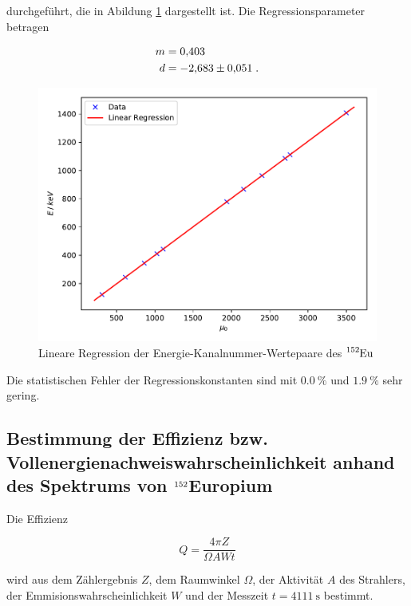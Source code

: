 durchgeführt, die in Abildung \ref{fig:plot5} dargestellt ist.
Die Regressionsparameter betragen

\begin{align*}
  m &= \num{0.403 +- 0.000} \\
  d &= \num{-2.683 +- 0.051} \; .
\end{align*}

\begin{figure}
  \centering
  \includegraphics{content/plot5.pdf}
  \caption{Lineare Regression der Energie-Kanalnummer-Wertepaare des $\ce{^{152}Eu}$}
  \label{fig:plot5}
\end{figure}

Die statistischen Fehler der Regressionskonstanten sind mit $\SI{0.0}{\percent}$ und $\SI{1.9}{\percent}$ sehr gering.


\subsection{Bestimmung der Effizienz bzw. Vollenergienachweiswahrscheinlichkeit anhand des Spektrums von $\ce{^{152}}$Europium}

Die Effizienz

\begin{equation}
  Q = \frac{4 \pi Z}{\Omega A W t}
\end{equation}

wird aus dem Zählergebnis $Z$, dem Raumwinkel $\Omega$, der Aktivität $A$ des Strahlers, 
der Emmisionswahrscheinlichkeit $W$ und der Messzeit $t = \SI{4111}{\second}$ bestimmt.

